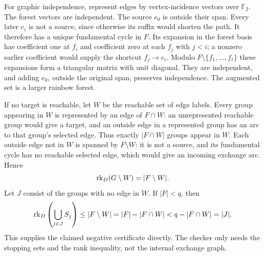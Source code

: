 For graphic independence, represent edges by vertex-incidence vectors
over $\mathbb F_2$.  The forest vectors are independent.  The source
$e_0$ is outside their span.  Every later $e_i$ is not a source, since
otherwise its suffix would shorten the path.  It therefore has a unique
fundamental cycle in $F$.  Its expansion in the forest basis has
coefficient one at $f_i$ and coefficient zero at each $f_j$ with $j<i$;
a nonzero earlier coefficient would supply the shortcut $f_j\to e_i$.
Modulo $F\setminus\{f_1,\ldots,f_\ell\}$ these expansions form a
triangular matrix with unit diagonal.  They are independent, and adding
$e_0$, outside the original span, preserves independence.  The augmented
set is a larger rainbow forest.

If no target is reachable, let $W$ be the reachable set of edge labels.
Every group appearing in $W$ is represented by an edge of $F\cap W$:
an unrepresented reachable group would give a target, and an outside
edge in a represented group has an arc to that group's selected edge.
Thus exactly $|F\cap W|$ groups appear in $W$.  Each outside edge not
in $W$ is spanned by $F\setminus W$: it is not a source, and its
fundamental cycle has no reachable selected edge, which would give an
incoming exchange arc.  Hence
\[
                   \operatorname{rk}_D(G\setminus W)=|F\setminus W|.
\]
Let $J$ consist of the groups with no edge in $W$.  If $|F|<q$, then
\[
 \operatorname{rk}_D\left(\bigcup_{j\in J}S_j\right)
 \leq |F\setminus W|
 =|F|-|F\cap W|<q-|F\cap W|=|J|.
\]
This supplies the claimed negative certificate directly.  The checker
only needs the stopping sets and the rank inequality, not the internal
exchange graph.

